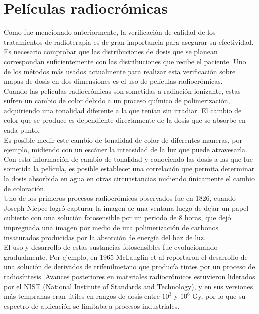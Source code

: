  
\section{Películas radiocrómicas}
Como fue mencionado anteriormente, la verificación de calidad de los tratamientos de radioterapia es de gran importancia para asegurar su efectividad. Es necesario comprobar que las distribuciones de dosis que se planean correspondan suficientemente con las distribuciones que recibe el paciente. Uno de los métodos más usados actualmente para realizar esta verificación sobre mapas de dosis en dos dimensiones es el uso de películas radiocrómicas.\\

Cuando las películas radiocrómicas son sometidas a radiación ionizante, estas sufren un cambio de color debido a un proceso químico de polimerización, adquiriendo una tonalidad diferente a la que tenían sin irradiar. El cambio de color que se produce es dependiente directamente de la dosis que se absorbe en cada punto. \\

Es posible medir este cambio de tonalidad de color de diferentes maneras, por ejemplo, midiendo con un escáner la intensidad de la luz que puede atravesarla. Con esta información de cambio de tonalidad y conociendo las dosis a las que fue sometida la película, es posible establecer una correlación que permita determinar la dosis absorbida en agua en otras circunstancias midiendo únicamente el cambio de coloración. \\

Uno de los primeros procesos radiocrómicos observados fue en 1826, cuando Joseph Niepce logró capturar la imagen de una ventana luego de dejar un papel cubierto con una solución fotosensible por un periodo de 8 horas, que dejó impregnada una imagen por medio de una polimerización de carbonos insaturados producidas por la absorción de energía del haz de luz.\\

El uso y desarrollo de estas sustancias fotosensibles fue evolucionando gradualmente. Por ejemplo, en 1965 McLauglin et al \cite{McLaughlin1965} reportaron el desarrollo de una solución de derivados de trifenilmetano que producía tintes por un proceso de radiosíntesis. Avances posteriores en materiales radiocrómicos estuvieron liderados por el NIST (National Institute of Standards and Technology), y en sus versiones más tempranas eran útiles en rangos de dosis entre $10^3$ y $10^6$ Gy, por lo que su espectro de aplicación se limitaba a procesos industriales\cite{Williams2011}.\\

